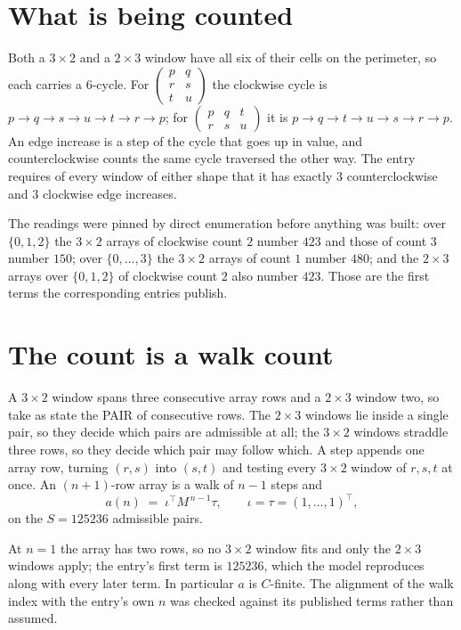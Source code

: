 \documentclass[11pt,a4paper]{article}
\theoremstyle{plain}
\theoremstyle{definition}
\begin{document}
\section{What is being counted}

Both a $3\times2$ and a $2\times3$ window have all six of their cells on the
perimeter, so each carries a $6$-cycle. For
$\begin{pmatrix}p&q\\r&s\\t&u\end{pmatrix}$ the clockwise cycle is
$p\to q\to s\to u\to t\to r\to p$; for
$\begin{pmatrix}p&q&t\\r&s&u\end{pmatrix}$ it is
$p\to q\to t\to u\to s\to r\to p$. An edge increase is a step of the cycle that goes up in
value, and counterclockwise counts the same cycle traversed the other way. The entry requires
of every window of either shape that it has exactly $3$ counterclockwise and $3$ clockwise edge increases.

The readings were pinned by direct enumeration before anything was built: over
$\{0,1,2\}$ the $3\times2$ arrays of clockwise count $2$ number $423$ and those of count
$3$ number $150$; over $\{0,\dots,3\}$ the $3\times2$ arrays of count $1$ number $480$;
and the $2\times3$ arrays over $\{0,1,2\}$ of clockwise count $2$ also number $423$. Those
are the first terms the corresponding entries publish.

\section{The count is a walk count}

A $3\times2$ window spans three consecutive array rows and a $2\times3$
window two, so take as state the PAIR of consecutive rows. The $2\times3$ windows lie inside a
single pair, so they decide which pairs are admissible at all; the $3\times2$ windows straddle
three rows, so they decide which pair may follow which. A step appends one array row, turning
$(r,s)$ into $(s,t)$ and testing every $3\times2$ window of $r,s,t$ at once. An $(n+1)$-row
array is a walk of $n-1$ steps and
\[
a(n)\;=\;\iota^{\!\top}M^{\,n-1}\tau,\qquad\iota=\tau=(1,\dots,1)^{\!\top},
\]
on the $S=125236$ admissible pairs.

At $n=1$ the array has two rows, so no $3\times2$ window fits and only the
$2\times3$ windows apply; the entry's first term is
$125236$, which the model reproduces along with every later term.
In particular $a$ is $C$-finite. The alignment of the walk index with the entry's own $n$ was
checked against its published terms rather than assumed.
\end{document}
